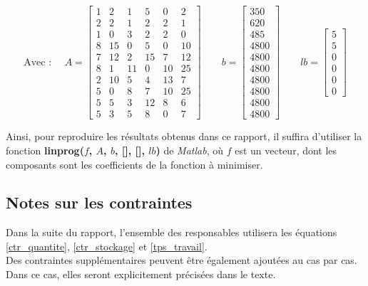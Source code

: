 \documentclass[paper=a4, fontsize=11pt]{report}
\numberwithin{equation}{section}		%
\numberwithin{figure}{section}			%
\numberwithin{table}{section}				%
\renewcommand{\bf}[1]{\textbf{#1}}
\begin{document}
\[ \text{Avec : } \quad A = \begin{bmatrix}
1 & 2 & 1 & 5 & 0 & 2 \\ 
2 & 2 & 1 & 2 & 2 & 1 \\ 
1 & 0 & 3 & 2 & 2 & 0 \\ 
8 & 15 & 0 & 5 & 0 & 10 \\ 
7 & 12 & 2 & 15 & 7 & 12 \\ 
8 & 1 & 11 & 0 & 10 & 25 \\ 
2 & 10 & 5 & 4 & 13 & 7 \\ 
5 & 0 & 8 & 7 & 10 & 25 \\ 
5 & 5 & 3 & 12 & 8 & 6 \\ 
5 & 3 & 5 & 8 & 0 & 7 
\end{bmatrix} \quad \quad
b = \begin{bmatrix}
350 \\ 
620 \\ 
485 \\ 
4800 \\ 
4800 \\ 
4800 \\ 
4800 \\ 
4800 \\ 
4800 \\ 
4800
\end{bmatrix} \quad \quad
lb = \begin{bmatrix}
5 \\
5 \\
0 \\
0 \\
0 \\
0
\end{bmatrix} 
  \]

Ainsi, pour reproduire les résultats obtenus dans ce rapport, il suffira d'utiliser la fonction \bf{linprog($f$, $A$, $b$, [], [], $lb$)} de \textit{Matlab}, où $f$ est un vecteur, dont les composants sont les coefficients de la fonction à minimiser.

\begin{shaded}
\vspace{-0.5cm}

\subsection*{Notes sur les contraintes}
Dans la suite du rapport, l'ensemble des responsables utilisera les équations \eqref{ctr_quantite}, \eqref{ctr_stockage} et \eqref{tps_travail}. \\

Des contraintes supplémentaires peuvent être également ajoutées au cas par cas. Dans ce cas, elles seront explicitement précisées dans le texte.
\end{shaded}
\end{document}
